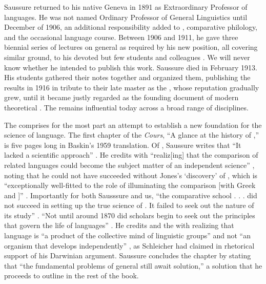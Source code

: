 \documentclass[output=paper,
modfonts
]{LSP/langsci}
\begin{document}
Saussure returned to his native Geneva in 1891 as Extraordinary Professor of  languages. He was not named Ordinary Professor of General Linguistics until December of 1906, an additional responsibility added to , comparative philology, and the occasional language course. Between 1906 and 1911, he gave three biennial series of lectures on general  as required by his new position, all covering similar ground, to his devoted but few students and colleagues \citep[617]{Joseph2012}. We will never know whether he intended to publish this work.  Saussure died in February 1913.  His students gathered their notes together and organized them, publishing the results in 1916 in tribute to their late master as the , whose reputation gradually grew, until it became justly regarded as the founding document of modern theoretical . The  remains influential today across a broad range of disciplines.

The  comprises for the most part an attempt to establish a new foundation for the science of language. The first chapter of the \textit{Cours}, ``A glance at the history of ,'' is five pages long in Baskin's 1959 translation. Of , Saussure writes that ``It lacked a scientific approach'' \citep[1]{Saussure1959}. He credits  with ``realiz[ing] that the comparison of related languages could become the subject matter of an independent science'' \citep[2]{Saussure1959}, noting that he could not have succeeded without Jones's ‘discovery' of , which is ``exceptionally well-fitted to the role of illuminating the comparison [with Greek and ]'' \citep[2]{Saussure1959}.  Importantly for both Sausssure and us, ``the comparative school . . . did not succeed in setting up the true science of . It failed to seek out the nature of its study'' \citep[3]{Saussure1959}. ``Not until around 1870 did scholars begin to seek out the principles that govern the life of languages'' \citep[4]{Saussure1959}. He credits \citet{Whitney1875} and the  with realizing that language is ``a product of the collective mind of linguistic groups'' \citep[5]{Saussure1959} and not ``an organism that develops independently'' \citep[5]{Saussure1959}, as Schleicher had claimed in rhetorical support of his Darwinian argument. Saussure concludes the chapter by stating that ``the fundamental problems of general  still await solution,'' a solution that he proceeds to outline in the rest of the book.
\end{document}
